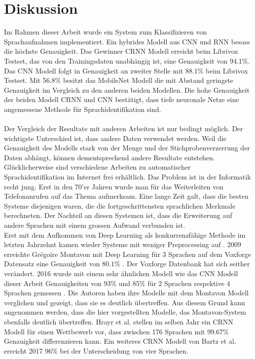 \section{Diskussion}
Im Rahmen dieser Arbeit wurde ein System zum Klassifizieren von Sprachaufnahmen implementiert. Ein hybrides Modell aus CNN und RNN besass die höchste Genauigkeit. Das Gewinner CRNN Modell erreicht beim Librivox Testset, das von den Trainingsdaten unabhängig ist, eine Genauigkeit von 94.1\%. Das CNN Modell folgt in Genauigkeit an zweiter Stelle mit 88.1\% beim Librivox Testset. Mit 56.8\% besitzt das MobileNet Modell die mit Abstand geringste Genauigkeit im Vergleich zu den anderen beiden Modellen. Die hohe Genauigkeit der beiden Modell CRNN und CNN bestätigt, dass tiefe neuronale Netze eine angemessene Methode für Sprachidentifikation sind.
\\ \\
Der Vergleich der Resultate mit anderen Arbeiten ist nur bedingt möglich. Der wichtigste Unterschied ist, dass andere Daten verwendet werden. Weil die Genauigkeit des Modells stark von der Menge und der Stichprobenverzerrung der Daten abhängt, können dementsprechend andere Resultate entstehen. Glücklicherweise sind verschiedene Arbeiten zu automatischer Sprachidentifikation im Internet frei erhältlich. Das Problem ist in der Informatik recht jung. Erst in den 70'er Jahren wurde man für das Weiterleiten von Telefonanrufen auf das Thema aufmerksam. Eine lange Zeit galt, dass die besten Systeme diejenigen waren, die die fortgeschrittensten sprachlichen Merkmale berechneten. Der Nachteil an diesen Systemen ist, dass die Erweiterung auf andere Sprachen mit einem grossen Aufwand verbunden ist. \parencite{history}
\\
Erst mit dem Aufkommen von Deep Learning als konkurrenzfähige Methode im letzten Jahrzehnt kamen wieder Systeme mit weniger Preprocessing auf \parencite{chollet}. 2009 erreichte Grégoire Montavon mit Deep Learning für 3 Sprachen auf dem Voxforge Datensatz eine Genauigkeit von $80.1\%$ \parencite{montavon}. Der Voxforge Datenbank hat sich seither verändert. 2016 wurde mit einem sehr ähnlichen Modell wie das CNN Modell dieser Arbeit Genauigkeiten von 93\% und 85\% für 2 Sprachen respektive 4 Sprachen gemessen \parencite{iLID}. Die Autoren haben ihre Modelle mit dem Montavon Modell verglichen und gezeigt, dass sie es deutlich übertreffen. Aus diesem Grund kann angenommen werden, dass die hier vorgestellten Modelle, das Montavon-System ebenfalls deutlich übertreffen. Hrayr et al. \parencite{yerevann} stellen im selben Jahr ein CRNN Modell für einen Wettbewerb vor, dass zwischen 176 Sprachen mit 99.67\% Genauigkeit differenzieren kann. Ein weiteres CRNN Modell von Bartz et al. \parencite{crnn} erreicht 2017 96\% bei der Unterscheidung von vier Sprachen.
